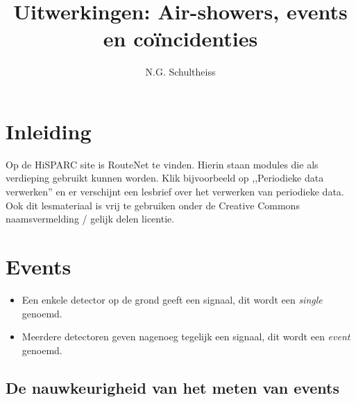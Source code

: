 



\title{Uitwerkingen: Air-showers, events en coïncidenties}


\author{N.G. Schultheiss}

\maketitle

\section{Inleiding}

Op de HiSPARC site is RouteNet te vinden. Hierin staan modules die
als verdieping gebruikt kunnen worden. Klik bijvoorbeeld op ,,Periodieke
data verwerken'' en er verschijnt een lesbrief over het verwerken
van periodieke data. Ook dit lesmateriaal is vrij te gebruiken onder
de Creative Commons naamsvermelding / gelijk delen licentie.


\section{Events}
\begin{itemize}
\item Een enkele detector op de grond geeft een signaal, dit wordt een \textit{single}
genoemd. 
\item Meerdere detectoren geven nagenoeg tegelijk een signaal, dit wordt
een \textit{event} genoemd. 
\end{itemize}

\subsection{De nauwkeurigheid van het meten van events}

